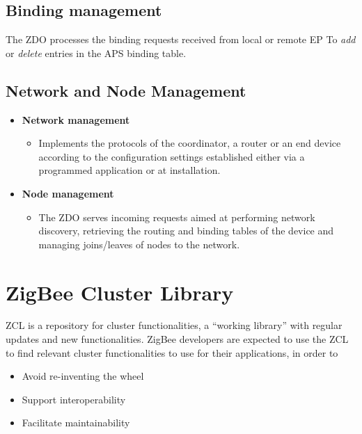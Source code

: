 \subsection{Binding management}
The ZDO processes the binding requests received from local or remote EP To \textit{add} or \textit{delete} entries in the APS binding table.

\subsection{Network and Node Management}
\begin{itemize}
   \item \textbf{Network management}
   \begin{itemize}
      \item Implements the protocols of the coordinator, a router or an
      end device according to the configuration settings established
      either via a programmed application or at installation.
   \end{itemize}
   \item \textbf{Node management}
   \begin{itemize}
      \item The ZDO serves incoming requests aimed at performing
      network discovery, retrieving the routing and binding tables of
      the device and managing joins/leaves of nodes to the
      network.
   \end{itemize}
\end{itemize}

\section{ZigBee Cluster Library}
ZCL is a repository for cluster functionalities, a “working library” with regular updates and new functionalities.
ZigBee developers are expected to use the ZCL to find relevant cluster functionalities to use for their applications, in order to 
\begin{itemize}
   \item Avoid re-inventing the wheel
   \item Support interoperability
   \item Facilitate maintainability
\end{itemize}

